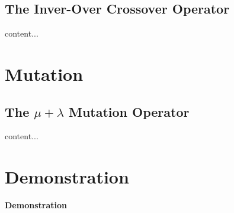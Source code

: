 \documentclass[xcolor={usenames,dvipsnames,svgnames}]{beamer}
\begin{document}
\subsection{The Inver-Over Crossover Operator}
\begin{frame}
content...
\end{frame}

\section{Mutation}
\subsection{The $\mu + \lambda$ Mutation Operator}
\begin{frame}
content...
\end{frame}

\nohead
\section{Demonstration}
\begin{frame}

{\Huge\bfseries Demonstration}
\end{frame}

\end{document}
